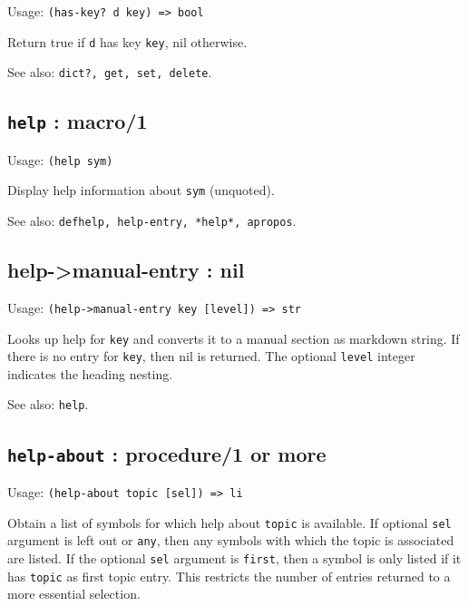 \documentclass[
]{article}
\newcommand{\passthrough}[1]{#1}
\begin{document}
Usage: \passthrough{\lstinline!(has-key? d key) => bool!}

Return true if \passthrough{\lstinline!d!} has key
\passthrough{\lstinline!key!}, nil otherwise.

See also: \passthrough{\lstinline!dict?, get, set, delete!}.

\hypertarget{help-macro1-1}{%
\subsection{\texorpdfstring{\texttt{help} :
macro/1}{help : macro/1}}\label{help-macro1-1}}

Usage: \passthrough{\lstinline!(help sym)!}

Display help information about \passthrough{\lstinline!sym!} (unquoted).

See also:
\passthrough{\lstinline!defhelp, help-entry, *help*, apropos!}.

\hypertarget{help-manual-entry-nil-1}{%
\subsection{help-\textgreater manual-entry :
nil}\label{help-manual-entry-nil-1}}

Usage: \passthrough{\lstinline!(help->manual-entry key [level]) => str!}

Looks up help for \passthrough{\lstinline!key!} and converts it to a
manual section as markdown string. If there is no entry for
\passthrough{\lstinline!key!}, then nil is returned. The optional
\passthrough{\lstinline!level!} integer indicates the heading nesting.

See also: \passthrough{\lstinline!help!}.

\hypertarget{help-about-procedure1-or-more-1}{%
\subsection{\texorpdfstring{\texttt{help-about} : procedure/1 or
more}{help-about : procedure/1 or more}}\label{help-about-procedure1-or-more-1}}

Usage: \passthrough{\lstinline!(help-about topic [sel]) => li!}

Obtain a list of symbols for which help about
\passthrough{\lstinline!topic!} is available. If optional
\passthrough{\lstinline!sel!} argument is left out or
\passthrough{\lstinline!any!}, then any symbols with which the topic is
associated are listed. If the optional \passthrough{\lstinline!sel!}
argument is \passthrough{\lstinline!first!}, then a symbol is only
listed if it has \passthrough{\lstinline!topic!} as first topic entry.
This restricts the number of entries returned to a more essential
selection.
\end{document}
